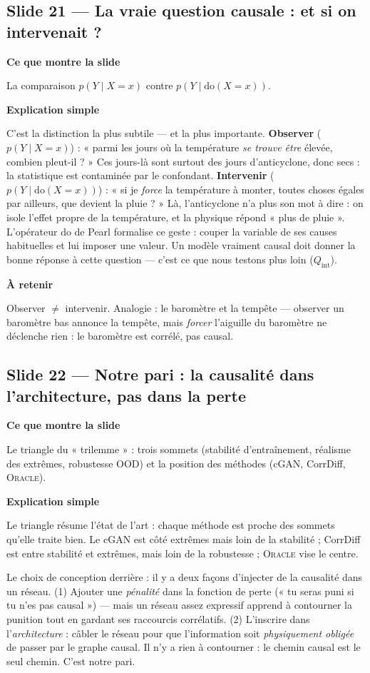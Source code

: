 \documentclass[11pt,a4paper]{article}
\newcommand{\slide}[2]{\subsection*{\textcolor{bleu}{Slide #1 --- #2}}}
\newcommand{\bloc}[1]{\par\medskip\noindent\textcolor{accent}{\textbf{#1}}\par\nopagebreak\smallskip}
\begin{document}
\slide{21}{La vraie question causale : et si on intervenait ?}

\bloc{Ce que montre la slide}
La comparaison $p(Y \mid X = x)$ contre $p(Y \mid \mathrm{do}(X = x))$.

\bloc{Explication simple}
C'est la distinction la plus subtile --- et la plus importante. \textbf{Observer} ($p(Y\mid X=x)$) : « parmi les jours où la température \emph{se trouve être} élevée, combien pleut-il ? » Ces jours-là sont surtout des jours d'anticyclone, donc secs : la statistique est contaminée par le confondant. \textbf{Intervenir} ($p(Y\mid \mathrm{do}(X=x))$) : « si je \emph{force} la température à monter, toutes choses égales par ailleurs, que devient la pluie ? » Là, l'anticyclone n'a plus son mot à dire : on isole l'effet propre de la température, et la physique répond « plus de pluie ». L'opérateur $\mathrm{do}$ de Pearl formalise ce geste : couper la variable de ses causes habituelles et lui imposer une valeur. Un modèle vraiment causal doit donner la bonne réponse à cette question --- c'est ce que nous testons plus loin ($Q_{\mathrm{int}}$).

\bloc{À retenir}
Observer $\ne$ intervenir. Analogie : le baromètre et la tempête --- observer un baromètre bas annonce la tempête, mais \emph{forcer} l'aiguille du baromètre ne déclenche rien : le baromètre est corrélé, pas causal.

\slide{22}{Notre pari : la causalité dans l'architecture, pas dans la perte}

\bloc{Ce que montre la slide}
Le triangle du « trilemme » : trois sommets (stabilité d'entraînement, réalisme des extrêmes, robustesse OOD) et la position des méthodes (cGAN, CorrDiff, \textsc{Oracle}).

\bloc{Explication simple}
Le triangle résume l'état de l'art : chaque méthode est proche des sommets qu'elle traite bien. Le cGAN est côté extrêmes mais loin de la stabilité ; CorrDiff est entre stabilité et extrêmes, mais loin de la robustesse ; \textsc{Oracle} vise le centre.

Le choix de conception derrière : il y a deux façons d'injecter de la causalité dans un réseau. (1) Ajouter une \emph{pénalité} dans la fonction de perte (« tu seras puni si tu n'es pas causal ») --- mais un réseau assez expressif apprend à contourner la punition tout en gardant ses raccourcis corrélatifs. (2) L'inscrire dans l'\emph{architecture} : câbler le réseau pour que l'information soit \emph{physiquement obligée} de passer par le graphe causal. Il n'y a rien à contourner : le chemin causal est le seul chemin. C'est notre pari.
\end{document}
